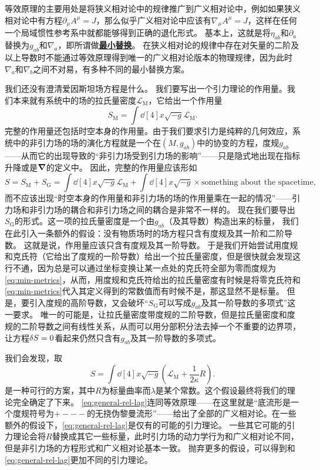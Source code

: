 \documentclass[hyperref, UTF8, a4paper]{ctexart}
\newcommand*{\concept}[1]{\underline{\textbf{#1}}}
\begin{document}
等效原理的主要用处是将狭义相对论中的规律推广到广义相对论中，例如如果狭义相对论中有方程$\partial_\mu A^\mu = J$，那么似乎广义相对论中应该有$\nabla_\mu A^\mu = J$，这样在任何一个局域惯性参考系中就都能够得到正确的退化形式。
基本上，这就是将$\eta_{ab}$和$\partial_a$替换为$g_{ab}$和$\nabla_a$，即所谓做\concept{最小替换}。
在狭义相对论的规律中存在对矢量的二阶及以上导数时不能通过等效原理得到唯一的广义相对论版本的物理规律，因为此时$\nabla_a$和$\nabla_b$之间不对易，有多种不同的最小替换方案。

我们还没有澄清爱因斯坦场方程是什么。
我们要写出一个引力理论的作用量。我们本来就有系统中的场的拉氏量密度$\mathcal{L}_\text{M}$，它给出一个作用量
\[
    S_\text{M} = \int \dd[4]{x} \sqrt{-g} \mathcal{L}_\text{M}.
\]
完整的作用量还包括时空本身的作用量。由于我们要求引力是纯粹的几何效应，系统中的非引力场的场的演化方程就是一个在$(M, g_{ab})$中的协变的方程，度规$g_{ab}$——从而它的出现导致的“非引力场受到引力场的影响”——只是隐式地出现在指标升降或是$\grad$的定义中。
因此，完整的作用量应该形如
\[
    S = S_\text{M} + S_\text{G} = \int \dd[4]{x} \sqrt{-g} \mathcal{L}_\text{M} + \int \dd[4]{x} \sqrt{-g} \times \text{something about the spacetime},
\]
而不应该出现“时空本身的作用量和非引力场的场的作用量乘在一起的情况”——引力场和非引力场的耦合和非引力场之间的耦合是非常不一样的。
现在我们要导出$S_\text{G}$的形式。这一项的拉氏量密度是一个由$g_{ab}$（及其导数）构造出来的标量，
我们在此引入一条额外的假设：没有物质场时的场方程只含有度规及其一阶和二阶导数。
这就是说，作用量应该只含有度规及其一阶导数。
于是我们开始尝试用度规和克氏符（它给出了度规的一阶导数）给出一个拉氏量密度，但是很快就会发现这行不通，因为总是可以通过坐标变换让某一点处的克氏符全部为零而度规为\eqref{eq:min-metrics}，从而，用度规和克氏符给出的拉氏量密度有时候是将零克氏符和\eqref{eq:min-metrics}代入其定义得到的常数值而有时候不是，那这显然不是标量。
但是，要引入度规的高阶导数，又会破坏“$S_\text{G}$可以写成$g_{ab}$及其一阶导数的多项式”这一要求。
唯一的可能是，让拉氏量密度带度规的二阶导数，但是拉氏量密度和度规的二阶导数之间有线性关系，从而可以用分部积分法去掉一个不重要的边界项，让方程$\var{S} = 0$看起来仍然只含有$g_{ab}$及其一阶导数的多项式。

我们会发现，取
\begin{equation}
    S = \int \dd[4]{x} \sqrt{-g} \left(\mathcal{L}_\text{M} + \frac{1}{2\kappa} R \right).
    \label{eq:general-rel-lag}
\end{equation}
是一种可行的方案，其中$R$为标量曲率而$\lambda$是某个常数。这个假设最终将我们的理论完全确定了下来。
\eqref{eq:general-rel-lag}连同等效原理——在这里就是“底流形是一个度规符号为$+---$的无挠伪黎曼流形”——给出了全部的广义相对论。在一些额外的假设下，\eqref{eq:general-rel-lag}是仅有的可能的引力理论。
一些其它可能的引力理论会将$R$替换成其它一些标量，此时引力场的动力学行为和广义相对论不同，但是非引力场的方程形式和广义相对论基本一致。
抛弃更多的假设，可以得到和\eqref{eq:general-rel-lag}更加不同的引力理论。
\end{document}
